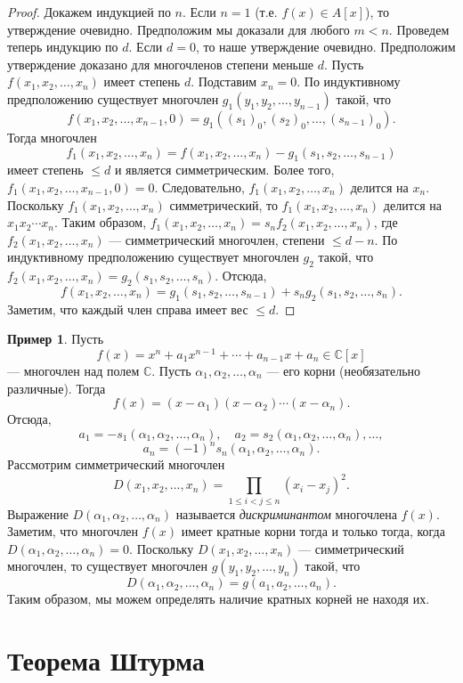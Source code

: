 \documentclass[12pt, titlepage, oneside]{amsbook}
\newcommand{\CC}{\mathbb{C}}
\theoremstyle{definition}
\newtheorem{example}[theorem]{Пример}
\theoremstyle{remark}
\begin{document}
\begin{proof}
	Докажем индукцией по $n$. Если $n=1$ (т.е. $f(x)\in A[x]$), то утверждение очевидно. Предположим мы доказали для любого $m<n$. Проведем теперь индукцию по $d$. Если $d=0$, то наше утверждение очевидно. Предположим утверждение доказано для многочленов степени меньше $d$. Пусть $f(x_1,x_2,\ldots,x_n)$ имеет степень $d$. Подставим $x_n=0$. По индуктивному предположению существует многочлен $g_1(y_1,y_2,\ldots,y_{n-1})$ такой, что $$f(x_1,x_2,\ldots,x_{n-1},0)=g_1((s_1)_0,(s_2)_0,\ldots,(s_{n-1})_0).$$ Тогда многочлен $$f_1(x_1,x_2,\ldots,x_n)=f(x_1,x_2,\ldots,x_n)-g_1(s_1,s_2,\ldots,s_{n-1})$$ имеет степень $\leq d$ и является симметрическим. Более того, $f_1(x_1,x_2,\ldots,x_{n-1},0)=0$. Следовательно, $f_1(x_1,x_2,\ldots,x_n)$ делится на $x_n$. Поскольку $f_1(x_1,x_2,\ldots,x_n)$ симметрический, то $f_1(x_1,x_2,\ldots,x_n)$ делится на $x_1x_2\cdots x_n$. Таким образом, $f_1(x_1,x_2,\ldots,x_n)=s_nf_2(x_1,x_2,\ldots,x_n)$, где $f_2(x_1,x_2,\ldots,x_n)$ --- симметрический многочлен, степени $\leq d-n$. По индуктивному предположению существует многочлен $g_2$ такой, что $f_2(x_1,x_2,\ldots,x_n)=g_2(s_1,s_2,\ldots,s_n)$. Отсюда, $$f(x_1,x_2,\ldots,x_n)=g_1(s_1,s_2,\ldots,s_{n-1})+s_ng_2(s_1,s_2,\ldots,s_n).$$ Заметим, что каждый член справа имеет вес $\leq d$.
\end{proof}

\begin{example}
	Пусть $$f(x)=x^n+a_1x^{n-1}+\cdots+a_{n-1}x+a_n\in\CC[x]$$ --- многочлен над полем $\CC$. Пусть $\alpha_1,\alpha_2,\ldots,\alpha_n$ --- его корни (необязательно различные). Тогда $$f(x)=(x-\alpha_1)(x-\alpha_2)\cdots(x-\alpha_n).$$ Отсюда, $$a_1=-s_1(\alpha_1,\alpha_2,\ldots,\alpha_n),\quad a_2=s_2(\alpha_1,\alpha_2,\ldots,\alpha_n),\ldots,$$ $$a_n=(-1)^ns_n(\alpha_1,\alpha_2,\ldots,\alpha_n).$$ Рассмотрим симметрический многочлен $$D(x_1,x_2,\ldots, x_n)=\prod\limits_{1\leq i<j\leq n}(x_i-x_j)^2.$$ Выражение $D(\alpha_1,\alpha_2,\ldots,\alpha_n)$ называется \emph{дискриминантом} многочлена $f(x)$. Заметим, что многочлен $f(x)$ имеет кратные корни тогда и только тогда, когда $D(\alpha_1,\alpha_2,\ldots,\alpha_n)=0$. Поскольку $D(x_1,x_2,\ldots, x_n)$ --- симметрический многочлен, то существует многочлен $g(y_1,y_2,\ldots,y_n)$ такой, что $$D(\alpha_1,\alpha_2,\ldots,\alpha_n)=g(a_1,a_2,\ldots,a_n).$$ Таким образом, мы можем определять наличие кратных корней не находя их.
\end{example}

\section{Теорема Штурма}
\end{document}
